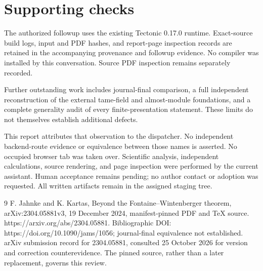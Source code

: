 \documentclass[10pt]{article}
\begin{document}
\section*{Supporting checks}
The authorized followup uses the existing Tectonic 0.17.0 runtime. Exact-source build logs, input and PDF hashes, and report-page inspection records are retained in the accompanying provenance and followup evidence. No compiler was installed by this conversation. Source PDF inspection remains separately recorded.\par
Further outstanding work includes journal-final comparison, a full independent reconstruction of the external tame-field and almost-module foundations, and a complete generality audit of every finite-presentation statement. These limits do not themselves establish additional defects.\par
This report attributes that observation to the dispatcher. No independent backend-route evidence or equivalence between those names is asserted. No occupied browser tab was taken over. Scientific analysis, independent calculations, source rendering, and page inspection were performed by the current assistant. Human acceptance remains pending; no author contact or adoption was requested. All written artifacts remain in the assigned staging tree.\par
9 F. Jahnke and K. Kartas, Beyond the Fontaine–Wintenberger theorem, arXiv:2304.05881v3, 19 December 2024, manifest-pinned PDF and TeX source. https://arxiv.org/abs/2304.05881. Bibliographic DOI: https://doi.org/10.1090/jams/1056; journal-final equivalence not established. arXiv submission record for 2304.05881, consulted 25 October 2026 for version and correction counterevidence. The pinned source, rather than a later replacement, governs this review.\par
\end{document}
